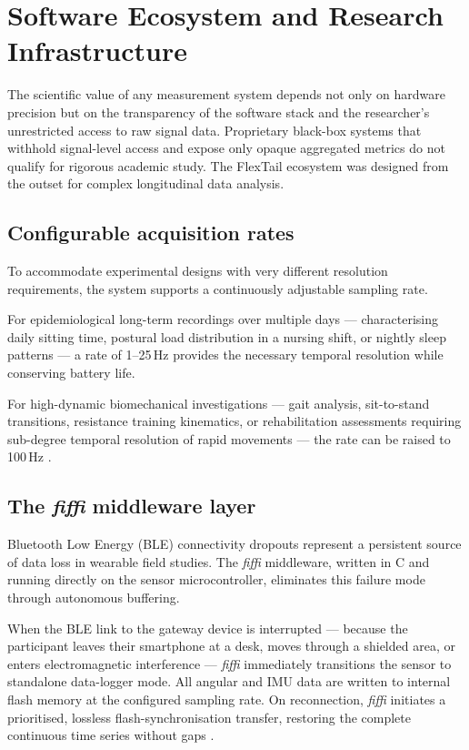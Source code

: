 \section{Software Ecosystem and Research Infrastructure}
\label{sec:software}

The scientific value of any measurement system depends not only on hardware precision
but on the transparency of the software stack and the researcher's unrestricted
access to raw signal data.
Proprietary black-box systems that withhold signal-level access and expose only
opaque aggregated metrics do not qualify for rigorous academic study.
The FlexTail ecosystem was designed from the outset for complex longitudinal
data analysis.

\subsection{Configurable acquisition rates}

To accommodate experimental designs with very different resolution requirements, the
system supports a continuously adjustable sampling rate.

For epidemiological long-term recordings over multiple days --- characterising daily
sitting time, postural load distribution in a nursing shift, or nightly sleep
patterns --- a rate of 1--25\,Hz provides the necessary temporal resolution while
conserving battery life.

For high-dynamic biomechanical investigations --- gait analysis, sit-to-stand
transitions, resistance training kinematics, or rehabilitation assessments requiring
sub-degree temporal resolution of rapid movements --- the rate can be raised to
100\,Hz \cite{walkling2025}.

\subsection{The \emph{fiffi} middleware layer}

Bluetooth Low Energy (\acs{BLE}) connectivity dropouts represent a persistent source of
data loss in wearable field studies.
The \emph{fiffi} middleware, written in C and running directly on the sensor
microcontroller, eliminates this failure mode through autonomous buffering.

When the \acs{BLE} link to the gateway device is interrupted --- because the participant
leaves their smartphone at a desk, moves through a shielded area, or enters
electromagnetic interference --- \emph{fiffi} immediately transitions the sensor to
standalone data-logger mode.
All angular and \acs{IMU} data are written to internal flash memory at the configured
sampling rate.
On reconnection, \emph{fiffi} initiates a prioritised, lossless flash-synchronisation
transfer, restoring the complete continuous time series without gaps \cite{walkling2025}.

